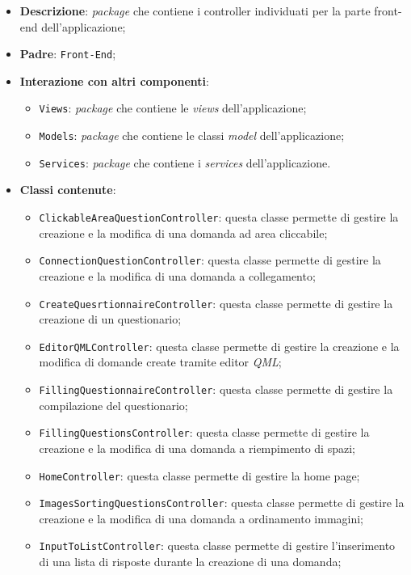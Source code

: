 \begin{itemize}
	\item \textbf{Descrizione}: \textit{package} che contiene i controller individuati per la parte front-end dell'applicazione;
	\item \textbf{Padre}: \texttt{Front-End};
	\item \textbf{Interazione con altri componenti}:
	\begin{itemize}
		\item \texttt{Views}: \textit{package} che contiene le \textit{views} dell'applicazione;
		\item \texttt{Models}: \textit{package} che contiene le classi \textit{model} dell'applicazione;
		\item \texttt{Services}: \textit{package} che contiene i \textit{services} dell'applicazione.
	\end{itemize}
	\item \textbf{Classi contenute}:
	\begin{itemize}
		\item \texttt{ClickableAreaQuestionController}: questa classe permette di gestire la creazione e la modifica di una domanda ad area cliccabile;
		\item \texttt{ConnectionQuestionController}: questa classe permette di gestire la creazione e la modifica di una domanda a collegamento;
		\item \texttt{CreateQuesrtionnaireController}: questa classe permette di gestire la creazione di un questionario;
		\item \texttt{EditorQMLController}: questa classe permette di gestire la creazione e la modifica di domande create tramite editor \textit{QML};
		\item \texttt{FillingQuestionnaireController}: questa classe permette di gestire la compilazione del questionario;
		\item \texttt{FillingQuestionsController}: questa classe permette di gestire la creazione e la modifica di una domanda	a riempimento di spazi;
		\item \texttt{HomeController}: questa classe permette di gestire la home page;
		\item \texttt{ImagesSortingQuestionsController}: questa classe permette di gestire la creazione e la modifica di una domanda a ordinamento immagini;
		\item \texttt{InputToListController}: questa classe permette di gestire l'inserimento di una lista di risposte durante la creazione di una domanda;

\end{itemize}
\end{itemize}
